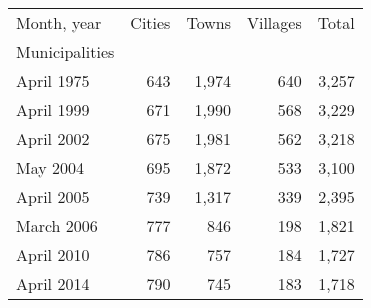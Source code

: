 \begin{tabular}{lrrrr}
\toprule
Month, year & Cities& Towns & Villages& Total \\ Municipalities \\
\midrule
April 1975  & 643   & 1,974 & 640     & 3,257 \\
April 1999  & 671   & 1,990 & 568     & 3,229 \\
April 2002  & 675   & 1,981 & 562     & 3,218 \\
May 2004    & 695   & 1,872 & 533     & 3,100 \\
April 2005  & 739   & 1,317 & 339     & 2,395 \\
March 2006  & 777   &   846 & 198     & 1,821 \\
April 2010  & 786   &   757 & 184     & 1,727 \\
April 2014  & 790   &   745 & 183     & 1,718 \\
\bottomrule
\end{tabular}
%
%
%     
